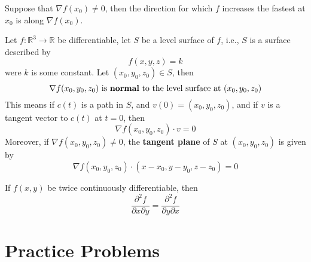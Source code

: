 \documentclass[openany]{book}
\newcommand{\R}{\mathbb{R}}
\begin{document}
\begin{prop}
    Suppose that $\nabla f(x_0)\neq 0$, then the direction for which $f$ increases the fastest at $x_0$ is along $\nabla f(x_0)$.
\end{prop}


\begin{prop}\label{tangent plane}
    Let $f:\R^3\to\R$ be differentiable, let $S$ be a level surface of $f$, i.e., $S$ is a surface described by 
    \begin{equation*}
        f(x,y,z)=k
    \end{equation*}
    were $k$ is some constant. Let $(x_0,y_0,z_0)\in S$, then
    \begin{equation*}
        \nabla f(x_0,y_0,z_0) \text{ is \textbf{normal} to the level surface at } (x_0,y_0,z_0)
    \end{equation*}
    This means if $c(t)$ is a path in $S$, and $v(0)=(x_0,y_0,z_0)$, and if $v$ is a tangent vector to $c(t)$ at $t=0$, then 
    \begin{equation*}
        \nabla f(x_0,y_0, z_0)\cdot v=0
    \end{equation*}
    Moreover, if $\nabla f(x_0,y_0,z_0)\neq 0$, the \textbf{tangent plane} of $S$ at $(x_0,y_0,z_0)$ is given by 
    \begin{equation*}
        \nabla f(x_0,y_0,z_0)\cdot (x-x_0, y-y_0, z-z_0)=0
    \end{equation*}
\end{prop}

\begin{prop}
    If $f(x,y)$ be twice continuously differentiable, then 
    \begin{equation*}
        \frac{\partial^2 f}{\partial x\partial y}=\frac{\partial^2f}{\partial y\partial x}
    \end{equation*}
\end{prop}

















\chapter{Practice Problems}
\end{document}
